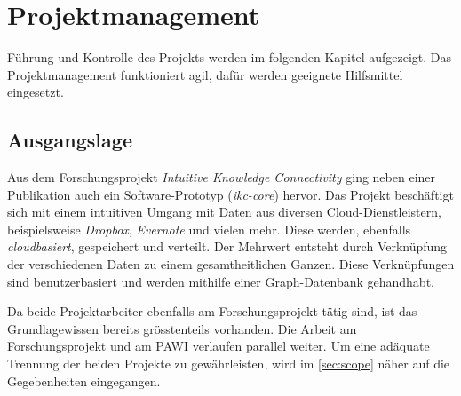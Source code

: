 \chapter{Projektmanagement}

Führung und Kontrolle des Projekts werden im folgenden Kapitel aufgezeigt. Das Projektmanagement funktioniert agil, dafür werden geeignete Hilfsmittel eingesetzt. 

\section{Ausgangslage}
Aus dem Forschungsprojekt \textit{Intuitive Knowledge Connectivity} \cite{ikc:hslu} ging neben einer Publikation \cite{ikc-paper:hslu} auch ein Software-Prototyp (\textit{ikc-core}) hervor. Das Projekt beschäftigt sich mit einem intuitiven Umgang mit Daten aus diversen Cloud-Dienstleistern, beispielsweise \textit{Dropbox}, \textit{Evernote} und vielen mehr. Diese werden, ebenfalls \textit{cloudbasiert}, gespeichert und verteilt. Der Mehrwert entsteht durch Verknüpfung der verschiedenen Daten zu einem gesamtheitlichen Ganzen. Diese Verknüpfungen sind be\-nutzer\-bas\-iert und werden mithilfe einer Graph-Datenbank gehandhabt.

Da beide Projektarbeiter ebenfalls am Forschungsprojekt tätig sind, ist das Grundlagewissen bereits grösstenteils vorhanden. Die Arbeit am Forschungsprojekt und am PAWI verlaufen parallel weiter. Um eine adäquate Trennung der beiden Projekte zu gewährleisten, wird im \autoref{sec:scope} näher auf die Gegebenheiten eingegangen.

